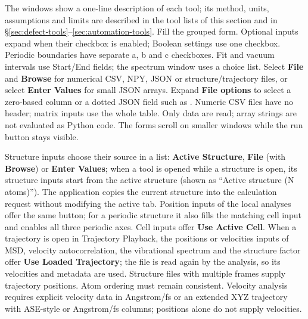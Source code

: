 The windows show a one-line description of each tool; its method, units, assumptions and limits are described in the tool lists of this section and in \S\ref{sec:defect-tools}--\ref{sec:automation-tools}. Fill the grouped form. Optional inputs expand when their checkbox is enabled; Boolean settings use one checkbox. Periodic boundaries have separate a, b and c checkboxes. Fit and vacuum intervals use Start/End fields; the spectrum window uses a choice list. Select \textbf{File} and \textbf{Browse} for numerical CSV, NPY, JSON or structure/trajectory files, or select \textbf{Enter Values} for small JSON arrays. Expand \textbf{File options} to select a zero-based column or a dotted JSON field such as . Numeric CSV files have no header; matrix inputs use the whole table. Only data are read; array strings are not evaluated as Python code. The forms scroll on smaller windows while the run button stays visible.

Structure inputs choose their source in a list: \textbf{Active Structure}, \textbf{File} (with \textbf{Browse}) or \textbf{Enter Values}; when a tool is opened while a structure is open, its structure inputs start from the active structure (shown as ``Active structure (N atoms)''). The application copies the current structure into the calculation request without modifying the active tab. Position inputs of the local analyses offer the same button; for a periodic structure it also fills the matching cell input and enables all three periodic axes. Cell inputs offer \textbf{Use Active Cell}. When a trajectory is open in Trajectory Playback, the positions or velocities inputs of MSD, velocity autocorrelation, the vibrational spectrum and the structure factor offer \textbf{Use Loaded Trajectory}; the file is read again by the analysis, so its velocities and  metadata are used. Structure files with multiple frames supply trajectory positions. Atom ordering must remain consistent. Velocity analysis requires explicit velocity data in Angstrom/fs or an extended XYZ trajectory with ASE-style  or Angstrom/fs  columns; positions alone do not supply velocities.

